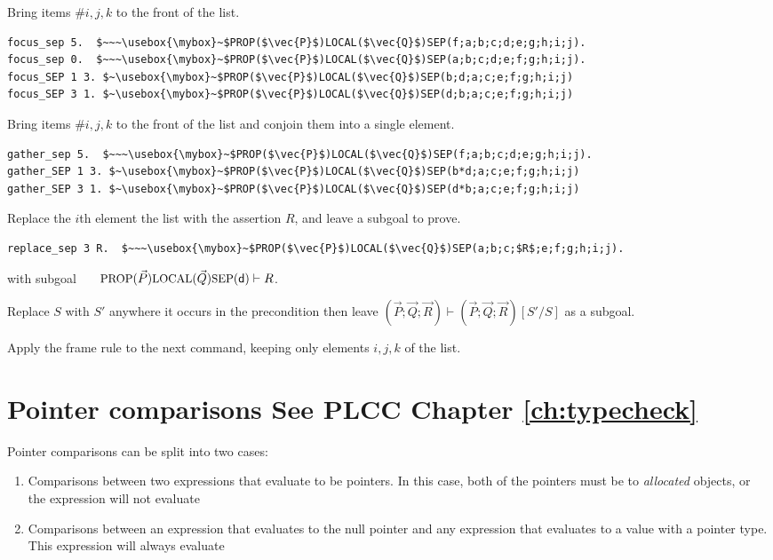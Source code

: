 \documentclass[12pt,fleqn,openany,oneside,showtrims]{memoir}
\newcommand{\ychapter}[2]{\chapter[#1]{#1 \hfill \normalsize #2}}
\begin{document}
\begin{description}\setlength{\itemsep}{2ex}
\item[$\mathsf{focus\_SEP}~i~j~k$.]
Bring items \#$i,j,k$ to the front of the \SEP{} list.
\begin{lstlisting}
focus_sep 5.  $~~~\usebox{\mybox}~$PROP($\vec{P}$)LOCAL($\vec{Q}$)SEP(f;a;b;c;d;e;g;h;i;j).
focus_sep 0.  $~~~\usebox{\mybox}~$PROP($\vec{P}$)LOCAL($\vec{Q}$)SEP(a;b;c;d;e;f;g;h;i;j).
focus_SEP 1 3. $~\usebox{\mybox}~$PROP($\vec{P}$)LOCAL($\vec{Q}$)SEP(b;d;a;c;e;f;g;h;i;j)
focus_SEP 3 1. $~\usebox{\mybox}~$PROP($\vec{P}$)LOCAL($\vec{Q}$)SEP(d;b;a;c;e;f;g;h;i;j)
\end{lstlisting}
\item[$\mathsf{gather\_SEP}~i~j~k$.]
Bring items \#$i,j,k$ to the front of the \SEP{} list
and conjoin them into a single element.
\begin{lstlisting}
gather_sep 5.  $~~~\usebox{\mybox}~$PROP($\vec{P}$)LOCAL($\vec{Q}$)SEP(f;a;b;c;d;e;g;h;i;j).
gather_SEP 1 3. $~\usebox{\mybox}~$PROP($\vec{P}$)LOCAL($\vec{Q}$)SEP(b*d;a;c;e;f;g;h;i;j)
gather_SEP 3 1. $~\usebox{\mybox}~$PROP($\vec{P}$)LOCAL($\vec{Q}$)SEP(d*b;a;c;e;f;g;h;i;j)
\end{lstlisting}
\item[$\mathsf{replace\_SEP}~i~R$.]
Replace the $i$th element the \SEP{} list
with the assertion $R$, and leave a subgoal to prove.
\begin{lstlisting}
replace_sep 3 R.  $~~~\usebox{\mybox}~$PROP($\vec{P}$)LOCAL($\vec{Q}$)SEP(a;b;c;$R$;e;f;g;h;i;j).
\end{lstlisting}
with subgoal~~~ $\mbox{\small PROP}(\vec{P})\mbox{\small LOCAL}(\vec{Q})\mbox{\small SEP}(\textsf{d}) \vdash R$.
\item[$\mathsf{replace\_in\_pre}~S~S'$.]
Replace $S$ with $S'$ anywhere it occurs in the precondition
then leave 
$(\vec{P};\vec{Q};\vec{R}) \vdash (\vec{P};\vec{Q};\vec{R})[S'/S]$
as a subgoal.
\item[$\mathsf{frame\_SEP}~i~j~k.$]
Apply the frame rule to the next command, keeping only
elements $i,j,k$ of the \SEP{} list.
\end{description}

\ychapter{Pointer comparisons}{See PLCC Chapter \ref{ch:typecheck}}
\label{refcard:pointer-cmp}
Pointer comparisons can be split into two cases:
\begin{enumerate}
  \item Comparisons between two expressions that evaluate to be pointers. In
  this case, both of the pointers must be to \emph{allocated} objects, or the
  expression will not evaluate
  \item Comparisons between an expression that evaluates to the null pointer and
  any expression that evaluates to a value with a pointer type. This expression
  will always evaluate
\end{enumerate}
\end{document}
